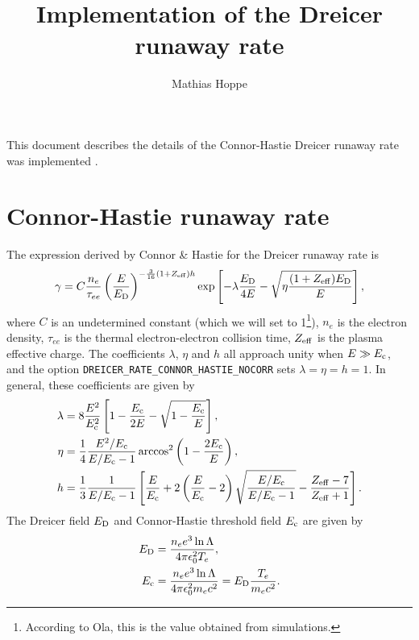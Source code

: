 \documentclass{notes}
\title{Implementation of the Dreicer runaway rate}
\author{Mathias Hoppe}
\newcommand{\Ec}{E_{\rm c}}
\newcommand{\ED}{E_{\rm D}}
\newcommand{\Zeff}{Z_{\rm eff}}
\begin{document}
    \maketitle

    \noindent
    This document describes the details of the Connor-Hastie Dreicer runaway
    rate was implemented \DREAM.

    \section*{Connor-Hastie runaway rate}
    The expression derived by Connor \& Hastie for the Dreicer runaway rate is
    \begin{equation}\label{eq:gammaCH}
        \gamma = C\frac{n_e}{\tau_{ee}} \left( \frac{E}{\ED} \right)^{-\frac{3}{16}(1+\Zeff)h}
        \exp\left[-\lambda\frac{\ED}{4E} - \sqrt{\eta\frac{(1+\Zeff)\ED}{E}} \right],
    \end{equation}
    where $C$ is an undetermined constant (which we will set to 1\footnote{
    According to Ola, this is the value obtained from simulations.}), $n_e$ is
    the electron density, $\tau_{ee}$ is the thermal electron-electron collision
    time, $\Zeff$ is the plasma effective charge. The coefficients $\lambda$,
    $\eta$ and $h$ all approach unity when $E\gg E_{\rm c}$, and the option
    \texttt{DREICER\_RATE\_CONNOR\_HASTIE\_NOCORR} sets $\lambda=\eta=h=1$.
    In general, these coefficients are given by
    \begin{equation}
        \label{eq:gammaCH_var}
        \begin{aligned}
            \lambda &= 8\frac{E^2}{\Ec^2}\left[ 1-\frac{\Ec}{2E}-\sqrt{1-\frac{\Ec}{E}} \right],\\
            \eta &= \frac{1}{4}\frac{E^2/\Ec}{E/\Ec-1}\arccos^2\left( 1-\frac{2\Ec}{E} \right),\\
            h &= \frac{1}{3}\frac{1}{E/\Ec-1}\left[ \frac{E}{\Ec}+
                2\left(\frac{E}{\Ec}-2\right)\sqrt{\frac{E/\Ec}{E/\Ec-1}} - \frac{\Zeff-7}{\Zeff+1}
            \right].
        \end{aligned}
    \end{equation}
    The Dreicer field $\ED$ and Connor-Hastie threshold field $\Ec$ are given by
    \begin{align}
        \ED &= \frac{n_e e^3\ln\Lambda}{4\pi\epsilon_0^2 T_e},\\
        \Ec &= \frac{n_e e^3\ln\Lambda}{4\pi\epsilon_0^2 m_ec^2} = \ED\frac{T_e}{m_ec^2}.
    \end{align}
\end{document}
